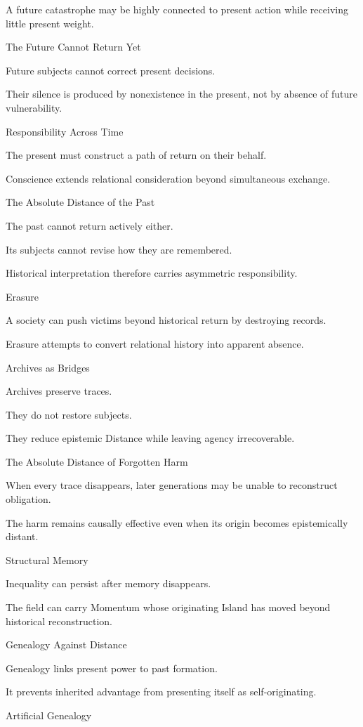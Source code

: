 A future catastrophe may be highly connected to present action while receiving little present weight.

The Future Cannot Return Yet

Future subjects cannot correct present decisions.

Their silence is produced by nonexistence in the present, not by absence of future vulnerability.

Responsibility Across Time

The present must construct a path of return on their behalf.

Conscience extends relational consideration beyond simultaneous exchange.

The Absolute Distance of the Past

The past cannot return actively either.

Its subjects cannot revise how they are remembered.

Historical interpretation therefore carries asymmetric responsibility.

Erasure

A society can push victims beyond historical return by destroying records.

Erasure attempts to convert relational history into apparent absence.

Archives as Bridges

Archives preserve traces.

They do not restore subjects.

They reduce epistemic Distance while leaving agency irrecoverable.

The Absolute Distance of Forgotten Harm

When every trace disappears, later generations may be unable to reconstruct obligation.

The harm remains causally effective even when its origin becomes epistemically distant.

Structural Memory

Inequality can persist after memory disappears.

The field can carry Momentum whose originating Island has moved beyond historical reconstruction.

Genealogy Against Distance

Genealogy links present power to past formation.

It prevents inherited advantage from presenting itself as self-originating.

Artificial Genealogy

